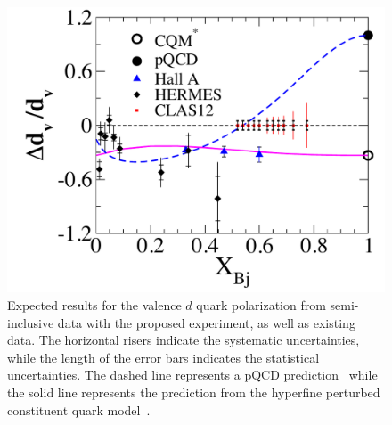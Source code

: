 

\begin{figure}[htb!]
\includegraphics[width=0.66\linewidth]{dis/DeltaDoverD-eps-converted-to.pdf}
\caption{\baselineskip 13pt \small
Expected results for the valence $d$ quark polarization from semi-inclusive data
with the proposed experiment, as well
as existing data. The horizontal risers indicate the systematic uncertainties, while the length of the error bars
indicates the statistical uncertainties.
The dashed line represents a pQCD prediction~\cite{Brodsky:1994kg}
 while the solid line represents the prediction from the
  hyperfine perturbed constituent quark model~\cite{Isgur:1998yb}. }
\label{rest}
\end{figure}


